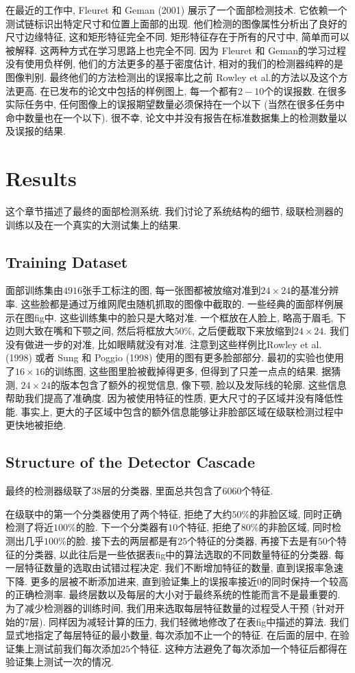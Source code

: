 \documentclass[utf8]{ctexart}
\begin{document}
在最近的工作中, Fleuret 和 Geman (2001) 展示了一个面部检测技术. 它依赖一个测试链标识出特定尺寸和位置上面部的出现. 他们检测的图像属性分析出了良好的尺寸边缘特征, 这和矩形特征完全不同. 矩形特征存在于所有的尺寸中, 简单而可以被解释. 这两种方式在学习思路上也完全不同.
因为 Fleuret 和 Geman的学习过程没有使用负样例, 他们的方法更多的基于密度估计, 相对的我们的检测器纯粹的是图像判别. 最终他们的方法检测出的误报率比之前 Rowley et al.的方法以及这个方法更高. 在已发布的论文中包括的样例图上, 每一个都有$2-10$个的误报数. 在很多实际任务中, 任何图像上的误报期望数量必须保持在一个以下 (当然在很多任务中命中数量也在一个以下). 很不幸, 论文中并没有报告在标准数据集上的检测数量以及误报的结果.
\section{Results}
这个章节描述了最终的面部检测系统. 我们讨论了系统结构的细节, 级联检测器的训练以及在一个真实的大测试集上的结果.
\subsection{Training Dataset}
面部训练集由$4916$张手工标注的图, 每一张图都被放缩对准到$24\times24$的基准分辨率. 这些脸都是通过万维网爬虫随机抓取的图像中截取的. 一些经典的面部样例展示在图fig中. 这些训练集中的脸只是大略对准. 一个框放在人脸上, 略高于眉毛, 下边则大致在嘴和下颚之间, 然后将框放大$50\%$, 之后便截取下来放缩到$24\times24$. 我们没有做进一步的对准, 比如眼睛就没有对准. 注意到这些样例比Rowley et al. (1998) 或者 Sung 和 Poggio (1998) 使用的图有更多脸部部分. 最初的实验也使用了$16\times16$的训练图, 这些图里脸被截掉得更多, 但得到了只差一点点的结果. 据猜测, $24\times24$的版本包含了额外的视觉信息, 像下颚, 脸以及发际线的轮廓. 这些信息帮助我们提高了准确度. 因为被使用特征的性质, 更大尺寸的子区域并没有降低性能. 事实上, 更大的子区域中包含的额外信息能够让非脸部区域在级联检测过程中更快地被拒绝.
\subsection{Structure of the Detector Cascade}
最终的检测器级联了$38$层的分类器, 里面总共包含了$6060$个特征.

在级联中的第一个分类器使用了两个特征, 拒绝了大约$50\%$的非脸区域, 同时正确检测了将近$100\%$的脸. 下一个分类器有$10$个特征, 拒绝了$80\%$的非脸区域, 同时检测出几乎$100\%$的脸.
接下去的两层都是有$25$个特征的分类器, 再接下去是有$50$个特征的分类器, 以此往后是一些依据表fig中的算法选取的不同数量特征的分类器. 每一层特征数量的选取由试错过程决定. 我们不断增加特征的数量, 直到误报率急速下降. 更多的层被不断添加进来, 直到验证集上的误报率接近$0$的同时保持一个较高的正确检测率. 最终层数以及每层的大小对于最终系统的性能而言不是最重要的.
为了减少检测器的训练时间, 我们用来选取每层特征数量的过程受人干预 (针对开始的$7$层). 同样因为减轻计算的压力, 我们轻微地修改了在表fig中描述的算法. 我们显式地指定了每层特征的最小数量, 每次添加不止一个的特征. 在后面的层中, 在验证集上测试前我们每次添加$25$个特征.
这种方法避免了每次添加一个特征后都得在验证集上测试一次的情况.
\end{document}
